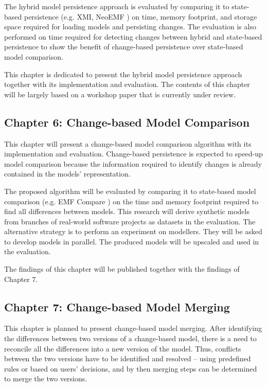 The hybrid model persistence approach is evaluated by comparing it to state-based persistence (e.g. XMI, NeoEMF \cite{daniel2016neoemf}) on time, memory footprint, and storage space required for loading models and persisting changes. The evaluation is also performed on time required for detecting changes between hybrid and state-based persistence to show the benefit of change-based persistence over state-based model comparison. 

This chapter is dedicated to present the hybrid model persistence approach together with its implementation and evaluation. The contents of this chapter will be largely based on a workshop paper \cite{DBLP:conf/models/YohannisRPK18} that is currently under review. 

\subsection{Chapter 6: Change-based Model Comparison}
\label{sec:chapter_6_change_based_model_comparison}
This chapter will present a change-based model comparison algorithm with its implementation and evaluation. Change-based persistence is expected to speed-up model comparison because the information required to identify changes is already contained in the models' representation. 

The proposed algorithm will be evaluated by comparing it to state-based model comparison (e.g. EMF Compare \cite{eclipse2017compare}) on the time and memory footprint required to find all differences between models. This research will derive synthetic models from branches of real-world software projects as datasets in the evaluation. The alternative strategy is to perform an experiment on modellers. They will be asked to develop models in parallel. The produced models will be upscaled and used in the evaluation. 

The findings of this chapter will be published together with the findings of Chapter 7.


\subsection{Chapter 7: Change-based Model Merging}
\label{sec:chapter_7_change_based_model_Merging}
This chapter is planned to present change-based model merging. After identifying the differences between two versions of a change-based model, there is a need to reconcile all the differences into a new version of the model. Thus, conflicts between the two versions have to be identified and resolved -- using predefined rules or based on users' decisions, and by then merging steps can be determined to merge the two versions. 


